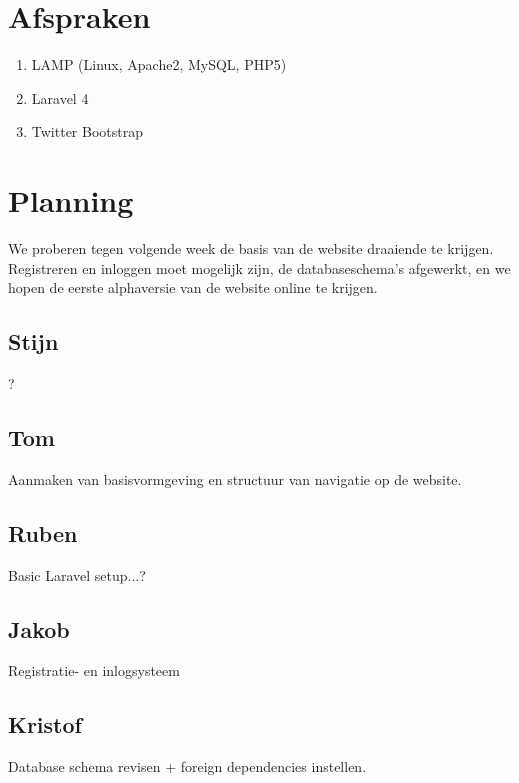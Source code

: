 \documentclass[11pt, a4paper]{article}
\begin{document}
\section{Afspraken}
\begin{enumerate}
\item LAMP (Linux, Apache2, MySQL, PHP5)
\item Laravel 4
\item Twitter Bootstrap
\end{enumerate}


\section{Planning}
We proberen tegen volgende week de basis van de website draaiende te krijgen. Registreren en inloggen moet mogelijk zijn, de databaseschema's afgewerkt, en we hopen de eerste alphaversie van de website online te krijgen.
\subsection{Stijn}
?
\subsection{Tom}
Aanmaken van basisvormgeving en structuur van navigatie op de website.
\subsection{Ruben}
Basic Laravel setup...?
\subsection{Jakob}
Registratie- en inlogsysteem
\subsection{Kristof}
Database schema revisen + foreign dependencies instellen.
\end{document}
